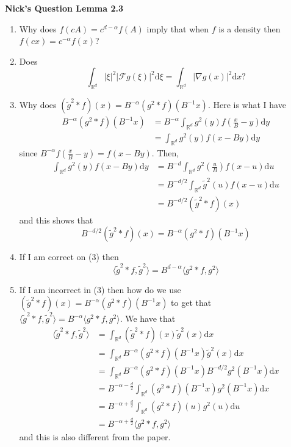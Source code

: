 \documentclass[a4paper,11pt]{article}
\numberwithin{equation}{section}
\theoremstyle{plain}
\theoremstyle{definition}
\newcommand{\ud}{\ensuremath{\mathrm{d}}}
\newcommand{\R}{\mathbb{R}}
\newcounter{NQ}
\newenvironment{NickQuestion}[1][] %
{\refstepcounter{NQ}
	\begin{mdframed}[backgroundcolor=lightgray]\textbf{Nick's Question \theNQ \: #1~~}~~~\noindent}%
	{\end{mdframed}}
\numberwithin{NQ}{section}
\numberwithin{LQ}{section}
\numberwithin{ZQ}{section}
\begin{document}
\begin{NickQuestion}[Lemma 2.3]
	\begin{enumerate}
		\item Why does $f(cA) = c^{d-\alpha}f(A)$ imply that when $f$ is a density then $f(cx)=c^{-\alpha}f(x)$? 
	
		\item 	Does 
	\[
		\int_{\R^d}|\xi|^2|\mathcal{F}g(\xi)|^2 \ud \xi = \int_{\R^d} |\nabla g(x)|^2 \ud x ? 
	\]
	
		\item Why does $(\tilde{g}^2*f)(x)=B^{-\alpha}(g^2*f)(B^{-1}x)$. Here is what I have
			\begin{align*}
				B^{-\alpha}(g^2*f)(B^{-1}x) &= B^{-\alpha}\int_{\R^d}g^2(y)f\left(\frac{x}{B}-y\right) \ud y
				\\&= \int_{\R^d}g^2(y)f\left(x-By\right) \ud y
			\end{align*}
	since $B^{-\alpha}f\left(\frac{x}{B}-y\right) = f(x-By)$. Then, 
	\begin{align*}
		\int_{\R^d}g^2(y)f\left(x-By\right) \ud y &= B^{-d}\int_{\R^d}g^2\left(\frac{u}{B}\right)f(x-u) \ud u
		\\&= B^{-d/2}\int_{\R^d}\tilde{g}^2\left(u\right)f(x-u) \ud u
		\\& = B^{-d/2}(\tilde{g}^2*f)(x)
	\end{align*}
	and this shows that 
	\[
	B^{-d/2}(\tilde{g}^2*f)(x) = B^{-\alpha}(g^2*f)(B^{-1}x)
	\]
	
	\item If I am correct on (3) then 
	\[
	\langle \tilde{g}^2*f, \tilde{g}^2 \rangle = B^{d-\alpha} 	\langle g^2*f, g^2 \rangle 
	\]
	
	\item If I am incorrect in (3) then how do we use $(\tilde{g}^2*f)(x)=B^{-\alpha}(g^2*f)(B^{-1}x)$ to get that $\langle \tilde{g}^2*f, \tilde{g}^2 \rangle = B^{-\alpha} 	\langle g^2*f, g^2 \rangle $. We have that 
	\begin{align*}
		\langle \tilde{g}^2*f, \tilde{g}^2 \rangle &= \int_{\R^d}  (\tilde{g}^2*f)(x)\tilde{g}^2(x) \ud x
		\\&=  \int_{\R^d}  B^{-\alpha}(g^2*f)(B^{-1}x)\tilde{g}^2(x) \ud x
		\\&=  \int_{\R^d}  B^{-\alpha}(g^2*f)(B^{-1}x)B^{-d/2}g^2(B^{-1}x) \ud x
		\\&= B^{-\alpha - \frac{d}{2}} \int_{\R^d} (g^2*f)(B^{-1}x)g^2(B^{-1}x) \ud x
		\\&  = B^{-\alpha + \frac{d}{2}} \int_{\R^d} (g^2*f)(u)g^2(u) \ud u
		\\& = B^{-\alpha + \frac{d}{2}}\langle g^2*f, g^2 \rangle 
	\end{align*}
	and this is also different from the paper. 
\end{enumerate}
\end{NickQuestion}
	
\end{document}

